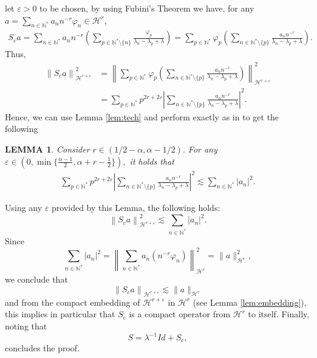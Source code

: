 \documentclass[11pt, dvipsnames]{amsart}
\newtheorem{lem}[theorem]{LEMMA}
\begin{document}
{\color{black}
let $\varepsilon>0$ to be chosen, by using Fubini's Theorem we have, 
for any $a = \sum\limits_{n\in\mathbb{N}^{*}} a_{n}n^{-r}\varphi_{n}\in \mathcal{H}^{r}$, 
\begin{align*}
    S_c a=\sum\limits_{n\in\mathbb{N}^{*}}a_{n}n^{-r}\left(\sum\limits_{p\in\mathbb{N}^{*}\setminus\{n\}}\frac{\varphi_{p}}{\lambda_{n}-\lambda_{p}+\lambda}\right)=\sum\limits_{p\in\mathbb{N}^{*}}\varphi_{p}\left(\sum\limits_{n\in\mathbb{N}^{*}\setminus\{p\}}\frac{a_{n}n^{-r}}{\lambda_{n}-\lambda_{p}+\lambda}\right).
\end{align*}
Thus,
\begin{equation}
\begin{split}
    \left\| S_{c} a\right\|_{\mathcal{H}^{r+\varepsilon}}^{2} &= 
    \left\| \sum\limits_{p\in\mathbb{N}^{*}}\varphi_{p}\left(\sum\limits_{n\in\mathbb{N}^{*}\setminus\{p\}}\frac{a_{n}n^{-r}}{\lambda_{n}-\lambda_{p}+\lambda}\right)\right\|_{\mathcal{H}^{r+\varepsilon}}^{2} \\
&=\sum\limits_{p\in\mathbb{N}^{*}}p^{2r+2\varepsilon}\left|\sum\limits_{n\in\mathbb{N}^{*}\setminus\{p\}}
    \frac{a_{n}n^{-r}}{\lambda_{n}-\lambda_{p}+\lambda}
    \right|^{2}.
    \end{split}
\end{equation}
Hence, we can use Lemma \ref{lem:tech} and perform exactly as in \cite[Lemma 4.7] {Gagnon2022-fredholm} to get the following
\begin{lem}\label{lemma-compact-sum}
    Consider $r\in(1/2-\alpha,\alpha-1/2).$ For any $\varepsilon\in \left(0,\min\{\frac{\alpha-1}{2}, \alpha+r-\frac{1}{2}\}\right),$ it holds that
    \begin{align*}
        \sum\limits_{p\in\mathbb{N}^{*}}p^{2r+2\varepsilon}\left|\sum\limits_{n\in\mathbb{N}^{*}\setminus\{p\}}
    \frac{a_{n}n^{-r}}{\lambda_{n}-\lambda_{p}+\lambda}
    \right|^{2}\lesssim \sum\limits_{n\in\mathbb{N}^{*}} |a_{n}|^{2}.
    \end{align*} 
\end{lem}  
Using any $\varepsilon$ provided by this Lemma, the following holds:
\begin{equation}
        \left\| S_{c} a\right\|^2_{\mathcal{H}^{r+\varepsilon}} \lesssim \sum\limits_{n\in\mathbb{N}^{*}} |a_{n}|^{2}. 
\end{equation}
Since 
\begin{equation}
\sum\limits_{n\in\mathbb{N}^{*}} |a_{n}|^{2} = 
\left\|\sum\limits_{n\in\mathbb{N}^{*}} a_{n} (n^{-r}\varphi_{n})\right\|_{\mathcal{H}^{r}}^{2} = \|a\|_{\mathcal{H}^{r}}^{2},
\end{equation}
we conclude that
\begin{equation}
    \left\| S_{c} a\right\|_{\mathcal{H}^{r+\varepsilon}}\lesssim \|a\|_{\mathcal{H}^{r}}
\end{equation}
and from the compact embedding of $\mathcal{H}^{r+\varepsilon}$ in $\mathcal{H}^{r}$ (see Lemma \ref{lem:embedding}),
this implies in particular that $S_{c}$ is a compact operator from $\mathcal{H}^{r}$ to itself. Finally, noting that
\begin{equation}
\label{S_c-expression}
    S = \lambda^{-1}Id + S_{c},
\end{equation}
concludes the proof.
}
\end{document}
